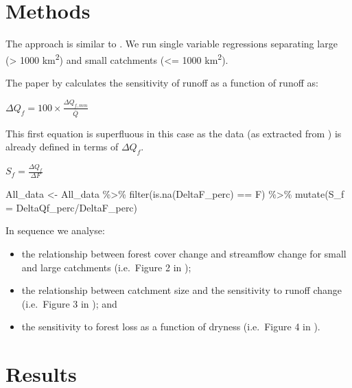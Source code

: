 \documentclass[]{elsarticle} %
\newenvironment{Shaded}{\begin{snugshade}}{\end{snugshade}}
\newcommand{\AttributeTok}[1]{\textcolor[rgb]{0.77,0.63,0.00}{#1}}
\newcommand{\FunctionTok}[1]{\textcolor[rgb]{0.00,0.00,0.00}{#1}}
\newcommand{\NormalTok}[1]{#1}
\newcommand{\OtherTok}[1]{\textcolor[rgb]{0.56,0.35,0.01}{#1}}
\newcommand{\SpecialCharTok}[1]{\textcolor[rgb]{0.00,0.00,0.00}{#1}}
\providecommand{\tightlist}{%
  \setlength{\itemsep}{0pt}\setlength{\parskip}{0pt}}
\begin{document}
\hypertarget{methods}{%
\section{Methods}\label{methods}}

The approach is similar to \citet{zhang2017}. We run single variable regressions separating large (\textgreater{} 1000 km\textsuperscript{2}) and small catchments (\textless= 1000 km\textsuperscript{2}).

The paper by \citet{zhang2017} calculates the sensitivity of runoff as a function of runoff as:

\(\Delta Q_f = 100 \times \frac{\Delta Q_{f,mm}}{\bar{Q}}\)

This first equation is superfluous in this case as the data (as extracted from \citet{zhang2017}) is already defined in terms of \(\Delta Q_f\).

\(S_f = \frac{\Delta Q_f}{\Delta F}\)

\begin{Shaded}
\begin{Highlighting}[]
\NormalTok{All\_data }\OtherTok{\textless{}{-}}\NormalTok{ All\_data }\SpecialCharTok{\%\textgreater{}\%}
  \FunctionTok{filter}\NormalTok{(}\FunctionTok{is.na}\NormalTok{(DeltaF\_perc) }\SpecialCharTok{==}\NormalTok{ F) }\SpecialCharTok{\%\textgreater{}\%}
  \FunctionTok{mutate}\NormalTok{(}\AttributeTok{S\_f =}\NormalTok{ DeltaQf\_perc}\SpecialCharTok{/}\NormalTok{DeltaF\_perc)}
\end{Highlighting}
\end{Shaded}

In sequence we analyse:

\begin{itemize}
\tightlist
\item
  the relationship between forest cover change and streamflow change for small and large catchments (i.e.~Figure 2 in \citet{zhang2017});\\
\item
  the relationship between catchment size and the sensitivity to runoff change (i.e.~Figure 3 in \citet{zhang2017}); and\\
\item
  the sensitivity to forest loss as a function of dryness (i.e.~Figure 4 in \citet{zhang2017}).
\end{itemize}

\hypertarget{results}{%
\section{Results}\label{results}}
\end{document}
